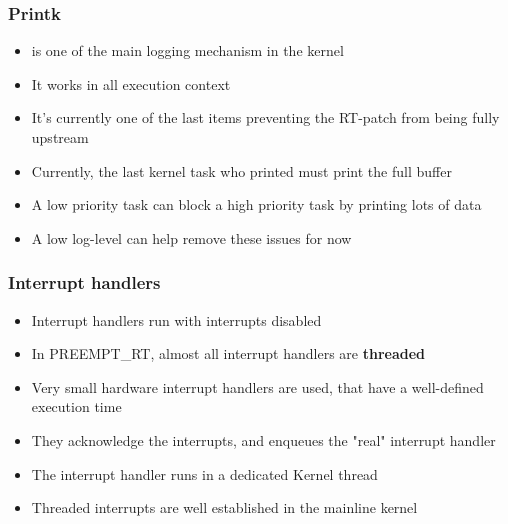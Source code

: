 \begin{frame}
  \frametitle{Printk}
	\begin{itemize}
		\item {} is one of the main logging mechanism in the kernel
		\item It works in all execution context
		\item It's currently one of the last items preventing the RT-patch from being fully upstream
		\item Currently, the last kernel task who printed must print the full buffer
		\item A low priority task can block a high priority task by printing lots of data
		\item A low log-level can help remove these issues for now
	\end{itemize}
\end{frame}

\begin{frame}
  \frametitle{Interrupt handlers}
	\begin{itemize}
		\item Interrupt handlers run with interrupts disabled
		\item In PREEMPT\_RT, almost all interrupt handlers are \textbf{threaded}
		\item Very small hardware interrupt handlers are used, that have a well-defined execution time
		\item They acknowledge the interrupts, and enqueues the "real" interrupt handler
		\item The interrupt handler runs in a dedicated Kernel thread
		\item Threaded interrupts are well established in the mainline kernel
	\end{itemize}
\end{frame}

